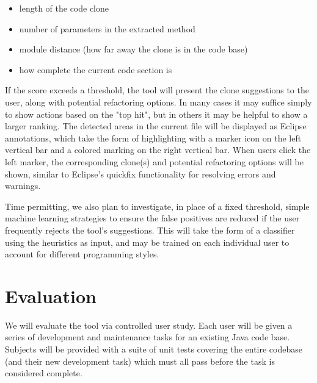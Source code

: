 \documentclass[preprint,10pt]{sigplanconf}
\begin{document}
\begin{itemize}
  \item length of the code clone
  \item number of parameters in the extracted method
  \item module distance (how far away the clone is in the code base)
  \item how complete the current code section is
\end{itemize}

If the score exceeds a threshold, the tool will present the 
clone suggestions to the user, along with potential refactoring options.  
In many cases it may suffice simply to show actions based on the "top 
hit", but in others it may be helpful to show a larger ranking.  The detected 
areas in the current file will be displayed as Eclipse annotations, which take 
the form of highlighting with a marker icon on the left vertical bar and a 
colored marking on the right vertical bar.  When users click the left marker,
the corresponding clone(s) and potential refactoring options will be shown, 
similar to Eclipse's quickfix functionality for resolving errors and warnings.

Time permitting, we also plan to investigate, in place of a 
fixed threshold, simple machine learning strategies to ensure the
false positives are reduced if the user frequently rejects the tool's
suggestions.  This will take the form of a classifier using the
heuristics as input, and may be trained on each individual user to
account for different programming styles.

\section{Evaluation}
\label{sec:eval}


We will evaluate the tool via controlled user study. Each user will be given
a series of development and maintenance tasks for an existing Java
code base. Subjects will be provided with a suite of unit tests covering the
entire codebase (and their new development task) which must all pass
before the task is considered complete.
\end{document}
